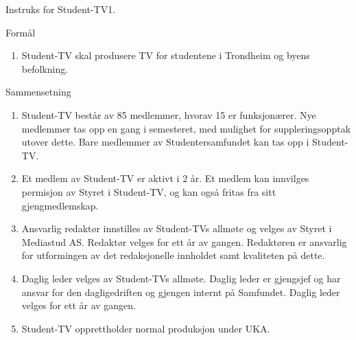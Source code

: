 
\begin{instruks}{Instruks for Student-TV}{1. }{}

    \begin{instruksledd}{Formål}
        \begin{enumerate}
            \item Student-TV skal produsere TV for studentene i Trondheim og byens befolkning.
        \end{enumerate}
    \end{instruksledd}

    \begin{instruksledd}{Sammensetning}
        \begin{enumerate}
            \item Student-TV består av 85 medlemmer, hvorav 15 er funksjonærer. Nye medlemmer tas
                opp en gang i semesteret, med mulighet for suppleringsopptak utover dette. Bare medlemmer av
                Studentersamfundet kan tas opp i Student-TV.
            \item Et medlem av Student-TV er aktivt i 2 år. Et medlem kan innvilges permisjon av
                Styret i Student-TV, og kan også fritas fra sitt gjengmedlemskap.
            \item Ansvarlig redaktør innstilles av Student-TVs allmøte og velges av Styret i
                Mediastud AS. Redaktør velges for ett år av gangen. Redaktøren er ansvarlig for utformingen av det
                redaksjonelle innholdet samt kvaliteten på dette.
            \item Daglig leder velges av Student-TVs allmøte. Daglig leder er gjengsjef og
                har ansvar for den dagligedriften og gjengen internt på Samfundet. Daglig leder velges for ett år av
                gangen.
            \item Student-TV opprettholder normal produksjon under UKA.
        \end{enumerate}
    \end{instruksledd}


\end{instruks}
